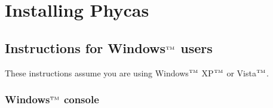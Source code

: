 \documentclass[10pt]{article}
\newcommand{\trademark}[1]{#1${}^{\mbox{\tiny TM}}$}
\begin{document}
\section{Installing Phycas}\label{sec:install}

\subsection{Instructions for \trademark{Windows} users} 

These instructions assume you are using \trademark{Windows} \trademark{XP} or \trademark{Vista}.

\subsubsection{\trademark{Windows} console}
\label{subsubsec:winconsole}
\end{document}
